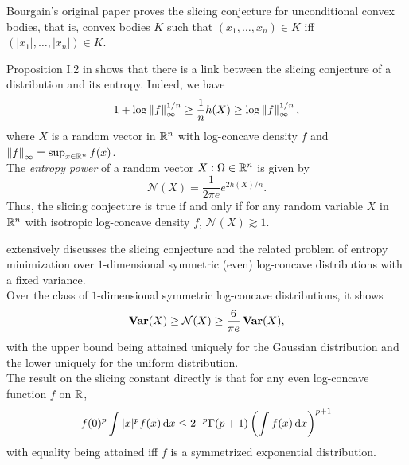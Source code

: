 \documentclass{article}
\begin{document}
	Bourgain's original paper \cite{bourgain-slicing} proves the slicing conjecture for unconditional convex bodies, that is, convex bodies $K$ such that $(x_1,\ldots,x_n) \in K$ iff $(|x_1|,\ldots,|x_n|) \in K$.

	Proposition I.2 in \cite{entropy-slicing} shows that there is a link between the slicing conjecture of a distribution and its entropy. Indeed, we have
	\begin{equation}
		1 + \log \left\lVert f\right\rVert_\infty^{1/n} \geq \frac{1}{n} h(X) \geq \log \left\lVert f\right\rVert_\infty^{1/n},
	\end{equation}
	where $X$ is a random vector in $\mathbb{R}^n$ with log-concave density $f$ and $\left\lVert f\right\rVert_\infty = \sup_{x \in \mathbb{R}^n} f(x)$.\\
	The \emph{entropy power} of a random vector $X : \Omega \in \mathbb{R}^n$ is given by
		\[ \mathcal{N}(X) = \frac{1}{2\pi e} e^{2h(X)/n}. \]
	Thus, the slicing conjecture is true if and only if for any random variable $X$ in $\mathbb{R}^n$ with isotropic log-concave density $f$, $\mathcal{N}(X) \gtrsim 1$.

	\cite{entropy-bound-1D-slicing} extensively discusses the slicing conjecture and the related problem of entropy minimization over $1$-dimensional symmetric (even) log-concave distributions with a fixed variance.\\
	Over the class of $1$-dimensional symmetric log-concave distributions, it shows
		\[ \operatorname{\textbf{Var}}(X) \ge \mathcal{N}(X) \geq \frac{6}{\pi e}\operatorname{\textbf{Var}}(X), \]
	with the upper bound being attained uniquely for the Gaussian distribution and the lower uniquely for the uniform distribution. \\
	The result on the slicing constant directly is that for any even log-concave function $f$ on $\mathbb{R}$,
		\[ f(0)^p \int |x|^p f(x) \dif x \le 2^{-p} \Gamma(p+1) \left( \int f(x) \dif x \right)^{p+1} \]
	with equality being attained iff $f$ is a symmetrized exponential distribution.\\
\end{document}
